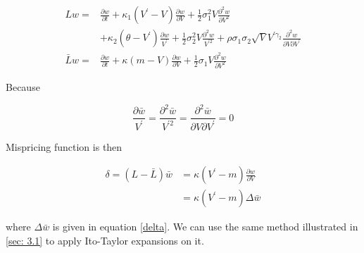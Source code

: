 \begin{equation}\label{inf gen2}
    \begin{aligned}
        L w=& \frac{\partial w}{\partial t}+\kappa_1(V^{\prime} - V) \frac{\partial w}{\partial V}+\frac{1}{2} \sigma_1^{2} V \frac{\partial^{2} w}{\partial V^{2}} \\
        &+ \kappa_2(\theta - V^{\prime}) \frac{\partial w}{V^{\prime}}+\frac{1}{2} \sigma_2^{2} V \frac{\partial^{2} w}{V^{\prime 2}} + \rho \sigma_1 \sigma_2 \sqrt{V} V^{\prime \gamma_2} \frac{\partial^2 w}{\partial V \partial V^{\prime}}\\
        \bar{L} w =& \frac{\partial w}{\partial t}+\kappa(m - V) \frac{\partial w}{\partial V}+\frac{1}{2} \sigma_1 V \frac{\partial^{2} w}{\partial V^{2}}
    \end{aligned}
\end{equation}

\noindent Because 

$$
\frac{\partial \bar{w}}{V^{\prime}} = \frac{\partial^{2} \bar{w}}{V^{\prime 2}} = \frac{\partial^2 \bar{w}}{\partial V \partial V^{\prime}} = 0
$$

\noindent Mispricing function is then

$$
\begin{aligned}
    \delta = (L - \bar{L}) \bar{w} &= \kappa(V^{\prime}- m)\frac{\partial w}{\partial V} \\
    &= \kappa(V^{\prime}-m) \Delta{\bar{w}}
\end{aligned}
$$

\noindent where $\Delta{\bar{w}}$ is given in equation \eqref{delta}. We can use the same method illustrated in \ref{sec: 3.1} to apply Ito-Taylor expansions on it.